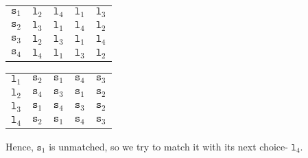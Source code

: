 \documentclass[a4paper, openany]{memoir}
\begin{document}
    \begin{table}[H]
        \centering
        \begin{subtable}{0.45\textwidth}
            \centering
            \begin{tabular}{c|cccc}
                $\texttt{s}_1$ & {\color{blue!60} $\texttt{l}_2$} & $\texttt{l}_4$ & $\texttt{l}_1$ & $\texttt{l}_3$ \\
                $\texttt{s}_2$ & \underline{$\texttt{l}_3$} & $\texttt{l}_1$ & $\texttt{l}_4$ & $\texttt{l}_2$ \\
                $\texttt{s}_3$ & \underline{$\texttt{l}_2$} & $\texttt{l}_3$ & $\texttt{l}_1$ & $\texttt{l}_4$ \\
                $\texttt{s}_4$ & $\texttt{l}_4$ & $\texttt{l}_1$ & $\texttt{l}_3$ & $\texttt{l}_2$
            \end{tabular}
        \end{subtable}
        \hfill
        \begin{subtable}{0.45\textwidth}
            \centering
            \begin{tabular}{c|cccc}
                $\texttt{l}_1$ & $\texttt{s}_2$ & $\texttt{s}_1$ & $\texttt{s}_4$ & $\texttt{s}_3$ \\
                $\texttt{l}_2$ & $\texttt{s}_4$ & \underline{$\texttt{s}_3$} & $\texttt{s}_1$ & $\texttt{s}_2$ \\
                $\texttt{l}_3$ & $\texttt{s}_1$ & $\texttt{s}_4$ & $\texttt{s}_3$ & \underline{$\texttt{s}_2$} \\
                $\texttt{l}_4$ & $\texttt{s}_2$ & $\texttt{s}_1$ & $\texttt{s}_4$ & $\texttt{s}_3$
            \end{tabular}
        \end{subtable}
    \end{table}
    \noindent Hence, $\texttt{s}_1$ is unmatched, so we try to match it with its next choice- $\texttt{l}_4$.
\end{document}
